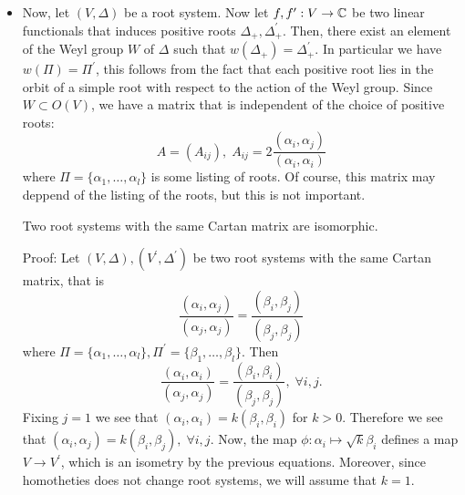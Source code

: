 \begin{itemize}
    \item Now, let $(V,\Delta)$ be a root system. Now let $f,f^\prime:V\to\mathbb{C}$ be two linear functionals
    that induces positive roots $\Delta_+,\Delta_+^\prime$. Then, there exist an element of the Weyl group $W$ of $\Delta$
    such that $w(\Delta_+)=\Delta_+^\prime$. In particular we have $w(\Pi)=\Pi^\prime$, this follows from the fact that 
    each positive root lies in the orbit of a simple root with respect to the action of the Weyl group. Since 
    $W\subset O(V)$, we have a matrix that is independent of the choice of positive roots:
    \begin{equation}
        A=(A_{ij}),\;A_{ij}=2\frac{(\alpha_i,\alpha_j)}{(\alpha_i,\alpha_i)}
    \end{equation}
    where $\Pi=\{\alpha_1,\dots,\alpha_l\}$ is some listing of roots. Of course, this matrix may deppend of the listing 
    of the roots, but this is not important.
   \begin{dang}
    \begin{lemma}
        Two root systems with the same Cartan matrix are isomorphic.
    \end{lemma}
\end{dang}
Proof: Let $(V,\Delta),(V^\prime,\Delta^\prime)$ be two root systems with the same Cartan matrix, that is 
\begin{equation}
    \frac{(\alpha_i,\alpha_j)}{(\alpha_j,\alpha_j)}=\frac{(\beta_i,\beta_j)}{(\beta_j,\beta_j)}
\end{equation}
where $\Pi=\{\alpha_1,\dots,\alpha_l\},\Pi^\prime=\{\beta_1,\dots,\beta_l\}$. Then 
\begin{equation}
    \frac{(\alpha_i,\alpha_i)}{(\alpha_j,\alpha_j)}=\frac{(\beta_i,\beta_i)}{(\beta_j,\beta_j)},\;\forall i,j.
\end{equation}
Fixing $j=1$ we see that $(\alpha_i,\alpha_i)=k(\beta_i,\beta_i)$ for $k>0$. Therefore we see that 
$(\alpha_i,\alpha_j)=k(\beta_i,\beta_j),\;\forall i,j$. Now, 
the map $\phi:\alpha_i\mapsto \sqrt{k}\beta_i$ defines a map $V\to V^\prime$, which is an isometry by the previous equations.
Moreover, since homotheties does not change root systems, we will assume that $k=1$.
\par


\end{itemize}
